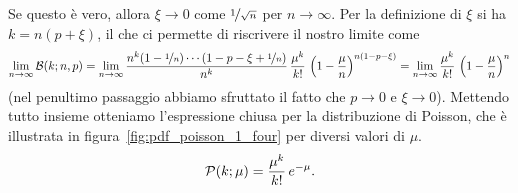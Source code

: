 Se questo è vero, allora $\xi \rightarrow 0$ come $\nicefrac{1}{\sqrt{n}}$
per $n \rightarrow \infty$. Per la definizione di $\xi$ si ha $k = n(p + \xi)$,
il che ci permette di riscrivere il nostro limite come
\begin{align*}
  \lim_{n \rightarrow \infty} \binomialpdf[n, p]{k} =
  \lim_{n \rightarrow \infty}
  \frac{n^k(1 - \nicefrac{1}{n})\cdots
    (1 - p -\xi + \nicefrac{1}{n})}{n^k}\,\frac{\mu^k}{k!}\,
  \left(1 - \frac{\mu}{n}\right)^{n(1 - p - \xi)} =
  \lim_{n\rightarrow\infty} \frac{\mu^k}{k!}\,\left(1 - \frac{\mu}{n}\right)^n
\end{align*}
(nel penultimo passaggio abbiamo sfruttato il fatto che $p \rightarrow 0$ e
$\xi \rightarrow 0$). Mettendo tutto insieme otteniamo l'espressione chiusa per
la distribuzione di Poisson, che è illustrata in
figura~\ref{fig:pdf_poisson_1_four} per diversi valori di $\mu$.
\begin{align}\label{eq:poisson_pdf}
  \poissonpdf[\mu]{k} = \frac{\mu^k}{k!}\,e^{-\mu}.
\end{align}


